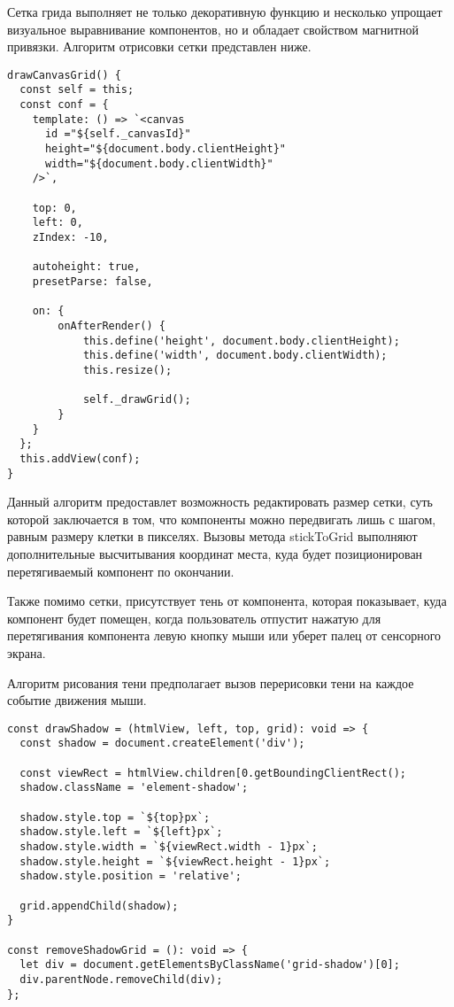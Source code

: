 Сетка грида выполняет не только декоративную функцию и несколько упрощает визуальное выравнивание компонентов, но и обладает свойством магнитной привязки. Алгоритм отрисовки сетки представлен ниже.

\begin{lstlisting}
drawCanvasGrid() {
  const self = this;
  const conf = {
    template: () => `<canvas
      id ="${self._canvasId}"
      height="${document.body.clientHeight}"
      width="${document.body.clientWidth}"
    />`,

    top: 0,
    left: 0,
    zIndex: -10,

    autoheight: true,
    presetParse: false,
    
    on: {
        onAfterRender() {
            this.define('height', document.body.clientHeight);
            this.define('width', document.body.clientWidth);
            this.resize();

            self._drawGrid();
        }
    }
  };
  this.addView(conf);
}
\end{lstlisting}

Данный алгоритм предоставлет возможность редактировать размер сетки, суть которой заключается в том, что компоненты можно передвигать лишь с шагом, равным размеру клетки в пикселях. Вызовы метода stickToGrid выполняют дополнительные высчитывания координат места, куда будет позиционирован перетягиваемый компонент по окончании.

Также помимо сетки, присутствует тень от компонента, которая показывает, куда компонент будет помещен, когда пользователь отпустит нажатую для перетягивания компонента левую кнопку мыши или уберет палец от сенсорного экрана.

Алгоритм рисования тени предполагает вызов перерисовки тени на каждое событие движения мыши.

\begin{lstlisting}
const drawShadow = (htmlView, left, top, grid): void => {
  const shadow = document.createElement('div');

  const viewRect = htmlView.children[0.getBoundingClientRect();
  shadow.className = 'element-shadow';

  shadow.style.top = `${top}px`;
  shadow.style.left = `${left}px`;
  shadow.style.width = `${viewRect.width - 1}px`;
  shadow.style.height = `${viewRect.height - 1}px`;
  shadow.style.position = 'relative';

  grid.appendChild(shadow);
}

const removeShadowGrid = (): void => {
  let div = document.getElementsByClassName('grid-shadow')[0];
  div.parentNode.removeChild(div);
};
\end{lstlisting}

